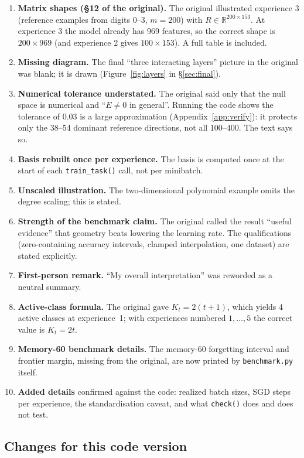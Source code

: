 \documentclass[11pt,a4paper]{article}
\newcommand{\R}{\mathbb{R}}
\newcommand{\code}[1]{\texttt{#1}}
\begin{document}
\begin{enumerate}
\item \textbf{Matrix shapes (\S12 of the original).} The original illustrated experience 3 (reference examples from digits 0--3, $m=200$) with $R\in\R^{200\times153}$. At experience 3 the model already has 969 features, so the correct shape is $200\times969$ (and experience 2 gives $100\times153$). A full table is included.
\item \textbf{Missing diagram.} The final ``three interacting layers'' picture in the original was blank; it is drawn (Figure~\ref{fig:layers} in \S\ref{sec:final}).
\item \textbf{Numerical tolerance understated.} The original said only that the null space is numerical and ``$E\neq0$ in general''. Running the code shows the tolerance of 0.03 is a large approximation (Appendix~\ref{app:verify}): it protects only the 38--54 dominant reference directions, not all 100--400. The text says so.
\item \textbf{Basis rebuilt once per experience.} The basis is computed once at the start of each \code{train\_task()} call, not per minibatch.
\item \textbf{Unscaled illustration.} The two-dimensional polynomial example omits the degree scaling; this is stated.
\item \textbf{Strength of the benchmark claim.} The original called the result ``useful evidence'' that geometry beats lowering the learning rate. The qualifications (zero-containing accuracy intervals, clamped interpolation, one dataset) are stated explicitly.
\item \textbf{First-person remark.} ``My overall interpretation'' was reworded as a neutral summary.
\item \textbf{Active-class formula.} The original gave $K_t=2(t+1)$, which yields 4 active classes at experience~1; with experiences numbered $1,\ldots,5$ the correct value is $K_t=2t$.
\item \textbf{Memory-60 benchmark details.} The memory-60 forgetting interval and frontier margin, missing from the original, are now printed by \code{benchmark.py} itself.
\item \textbf{Added details} confirmed against the code: realized batch sizes, SGD steps per experience, the standardisation caveat, and what \code{check()} does and does not test.
\end{enumerate}

\subsection{Changes for this code version}
\end{document}
